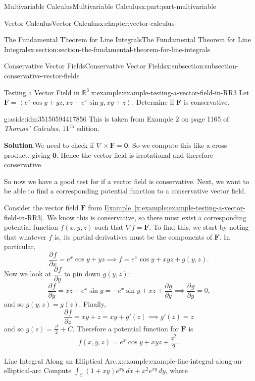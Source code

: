 \documentclass[twoside,10pt,]{book}
\newcommand{\blocktitlefont}{\relax}
\newcommand{\xreffont}{\relax}
\numberwithin{equation}{part}
\newcommand{\RR}{\mathbb{R}}
\newcommand{\grad}{\nabla}
\newcommand{\curl}{\nabla\times}
\newcommand{\vb}[1]{\mathbf{#1}}
\newcommand{\pdv}[3][]{\dfrac{\partial^{#1} #2}{\partial #3^{#1}}}
\newcommand{\dotprod}[1]{\left\langle #1 \right\rangle}
\begin{document}
\begin{partptx}{Multivariable Calculus}{}{Multivariable Calculus}{}{}{x:part:part-multivariable}
\begin{chapterptx}{Vector Calculus}{}{Vector Calculus}{}{}{x:chapter:vector-calculus}
\begin{sectionptx}{The Fundamental Theorem for Line Integrals}{}{The Fundamental Theorem for Line Integrals}{}{}{x:section:section-the-fundamental-theorem-for-line-integrals}
\begin{subsectionptx}{Conservative Vector Fields}{}{Conservative Vector Fields}{}{}{x:subsection:subsection-conservative-vector-fields}
\begin{example}{Testing a Vector Field in \(\RR^{3}\).}{x:example:example-testing-a-vector-field-in-RR3}%
Let \(\vb{F} = \dotprod{e^{x}\cos y + yz, xz - e^{x}\sin y, xy + z}\). Determine if \(\vb{F}\) is conservative.%
\begin{aside}{}{g:aside:idm35150594417856}%
This is taken from Example 2 on page 1165 of \emph{Thomas' Calculus}, \(11^{\text{th}}\) edition.%
\end{aside}
\par\smallskip%
\noindent\textbf{\blocktitlefont Solution}.\hypertarget{g:solution:idm35150594416704}{}\quad{}We need to check if \(\curl\vb{F} = \vb{0}\). So we compute this like a cross product, giving \(\vb{0}\). Hence the vector field is irrotational and therefore conservative.%
\end{example}
So now we have a good test for if a vector field is conservative. Next, we want to be able to find a corresponding potential function to a conservative vector field.%
\par
Consider the vector field \(\vb{F}\) from \hyperref[x:example:example-testing-a-vector-field-in-RR3]{Example~{\xreffont\ref{x:example:example-testing-a-vector-field-in-RR3}}}. We know this is conservative, so there must exist a corresponding potential function \(f(x,y,z)\) such that \(\grad f = \vb{F}\). To find this, we start by noting that whatever \(f\) is, its partial derivatives must be the components of \(\vb{F}\). In particular,%
\begin{equation*}
\pdv{f}{x} = e^{x}\cos y + yz \implies f = e^{x}\cos y + xyz + g(y,z)\text{.}
\end{equation*}
Now we look at \(\pdv{f}{y}\) to pin down \(g(y,z)\):%
\begin{equation*}
\pdv{f}{y} = xz - e^{x}\sin y = -e^{x}\sin y + xz + \pdv{g}{y} \implies \pdv{g}{y} = 0\text{,}
\end{equation*}
and so \(g(y,z) = g(z)\). Finally,%
\begin{equation*}
\pdv{f}{z} = xy + z = xy + g'(z) \implies g'(z) = z
\end{equation*}
and so \(g(z) = \frac{z^{2}}{2} + C\). Therefore a potential function for \(\vb{F}\) is%
\begin{equation*}
f(x,y,z) = e^{x}\cos y + xyz + \frac{z^{2}}{2}\text{.}
\end{equation*}
%
\begin{example}{Line Integral Along an Elliptical Arc.}{x:example:example-line-integral-along-an-elliptical-arc}%
Compute \(\int_{C}(1 + xy)e^{xy}\,dx + x^{2}e^{xy}\,dy\), where%

\end{example}
\end{subsectionptx}
\end{sectionptx}
\end{chapterptx}
\end{partptx}
\end{document}
